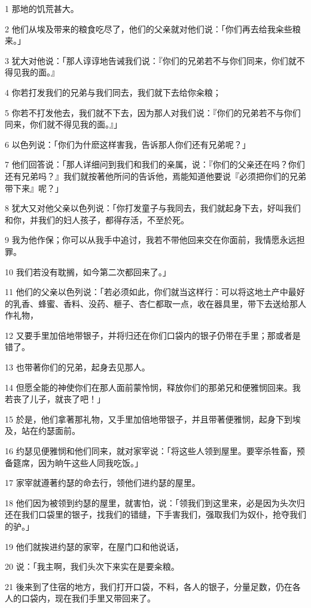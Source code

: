 \par 1 那地的饥荒甚大。
\par 2 他们从埃及带来的粮食吃尽了，他们的父亲就对他们说：「你们再去给我籴些粮来。」
\par 3 犹大对他说：「那人谆谆地告诫我们说：『你们的兄弟若不与你们同来，你们就不得见我的面。』
\par 4 你若打发我们的兄弟与我们同去，我们就下去给你籴粮；
\par 5 你若不打发他去，我们就不下去，因为那人对我们说：『你们的兄弟若不与你们同来，你们就不得见我的面。』」
\par 6 以色列说：「你们为什麽这样害我，告诉那人你们还有兄弟呢？」
\par 7 他们回答说：「那人详细问到我们和我们的亲属，说：『你们的父亲还在吗？你们还有兄弟吗？』我们就按著他所问的告诉他，焉能知道他要说『必须把你们的兄弟带下来』呢？」
\par 8 犹大又对他父亲以色列说：「你打发童子与我同去，我们就起身下去，好叫我们和你，并我们的妇人孩子，都得存活，不至於死。
\par 9 我为他作保；你可以从我手中追讨，我若不带他回来交在你面前，我情愿永远担罪。
\par 10 我们若没有耽搁，如今第二次都回来了。」
\par 11 他们的父亲以色列说：「若必须如此，你们就当这样行：可以将这地土产中最好的乳香、蜂蜜、香料、没药、榧子、杏仁都取一点，收在器具里，带下去送给那人作礼物，
\par 12 又要手里加倍地带银子，并将归还在你们口袋内的银子仍带在手里；那或者是错了。
\par 13 也带著你们的兄弟，起身去见那人。
\par 14 但愿全能的神使你们在那人面前蒙怜悯，释放你们的那弟兄和便雅悯回来。我若丧了儿子，就丧了吧！」
\par 15 於是，他们拿著那礼物，又手里加倍地带银子，并且带著便雅悯，起身下到埃及，站在约瑟面前。
\par 16 约瑟见便雅悯和他们同来，就对家宰说：「将这些人领到屋里。要宰杀牲畜，预备筵席，因为晌午这些人同我吃饭。」
\par 17 家宰就遵著约瑟的命去行，领他们进约瑟的屋里。
\par 18 他们因为被领到约瑟的屋里，就害怕，说：「领我们到这里来，必是因为头次归还在我们口袋里的银子，找我们的错缝，下手害我们，强取我们为奴仆，抢夺我们的驴。」
\par 19 他们就挨进约瑟的家宰，在屋门口和他说话，
\par 20 说：「我主啊，我们头次下来实在是要籴粮。
\par 21 後来到了住宿的地方，我们打开口袋，不料，各人的银子，分量足数，仍在各人的口袋内，现在我们手里又带回来了。
